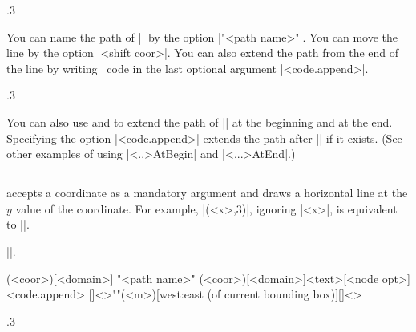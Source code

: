 \begin{tzcode}{.3}
{}
\end{tzcode}

You can name the path of |\tzhfnat| by the option |"<path name>"|.
You can move the line by the option |<shift coor>|.
You can also extend the path from the end of the line by writing \Tikz\ code in the last optional argument |<code.append>|.

\begin{tzcode}{.3}
\end{tzcode}

You can also use \icmd{\tzhfnatAtBegin} and \icmd{\tzhfnatAtEnd} to extend the path of |\tzhfnat| at the beginning and at the end. Specifying the option |<code.append>| extends the path after |\tzhfnatAtEnd| if it exists.
(See other examples of using |\tz<..>AtBegin| and |\tz<...>AtEnd|.)


\subsection{\protect\cmd{\tzhfn}}
\label{ss:tzhfn}

\icmd{\tzhfn} accepts a coordinate as a mandatory argument and draws a horizontal line at the $y$ value of the coordinate.
For example, |\tzhfn(<x>,3)|, ignoring |<x>|, is equivalent to ||.

 |\tzhfnat|.

\begin{tzdef}{}
\tzhfn(<coor>)[<domain>]
  "<path name>"
        (<coor>)[<domain>]{<text>}[<node opt>]<code.append>
  []<>""(<m>)[west:east (of current bounding box)]{}[]<>
\end{tzdef}

\begin{tzcode}{.3}
\end{tzcode}

